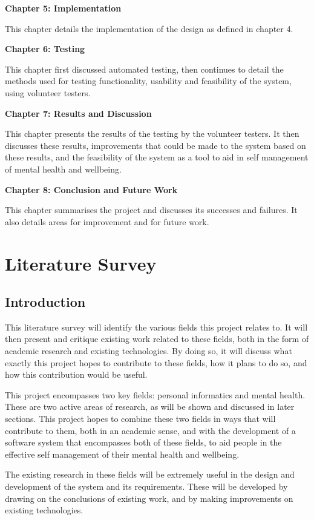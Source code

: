 \documentclass[11pt,openright,a4paper]{report}
\begin{document}
\textbf{Chapter 5: Implementation}

This chapter details the implementation of the design as defined in chapter 4.

\textbf{Chapter 6: Testing}

This chapter first discussed automated testing, then continues to detail the methods used for testing functionality, usability and feasibility of the system, using volunteer testers.

\textbf{Chapter 7: Results and Discussion}

This chapter presents the results of the testing by the volunteer testers. It then discusses these results, improvements that could be made to the system based on these results, and the feasibility of the system as a tool to aid in self management of mental health and wellbeing.

\textbf{Chapter 8: Conclusion and Future Work}

This chapter summarises the project and discusses its successes and failures. It also details areas for improvement and for future work.


\chapter{Literature Survey}
\section{Introduction} \label{introduction}
This literature survey will identify the various fields this project relates to. It will then present and critique existing work related to these fields, both in the form of academic research and existing technologies. By doing so, it will discuss what exactly this project hopes to contribute to these fields, how it plans to do so, and how this contribution would be useful.

This project encompasses two key fields: personal informatics and mental health. These are two active areas of research, as will be shown and discussed in later sections. This project hopes to combine these two fields in ways that will contribute to them, both in an academic sense, and with the development of a software system that encompasses both of these fields, to aid people in the effective self management of their mental health and wellbeing.

The existing research in these fields will be extremely useful in the design and development of the system and its requirements. These will be developed by drawing on the conclusions of existing work, and by making improvements on existing technologies.
\end{document}
